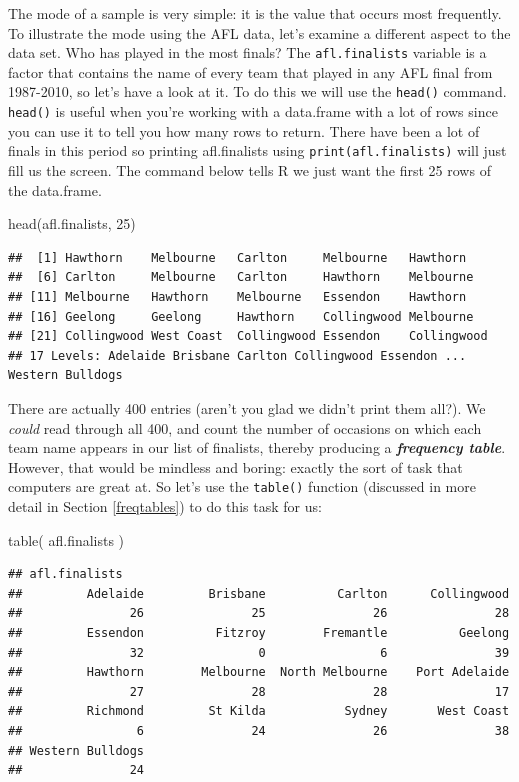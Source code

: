 \documentclass[
]{book}
\newenvironment{Shaded}{\begin{snugshade}}{\end{snugshade}}
\newcommand{\DecValTok}[1]{\textcolor[rgb]{0.00,0.00,0.81}{#1}}
\newcommand{\FunctionTok}[1]{\textcolor[rgb]{0.00,0.00,0.00}{#1}}
\newcommand{\NormalTok}[1]{#1}
\begin{document}
The mode of a sample is very simple: it is the value that occurs most frequently. To illustrate the mode using the AFL data, let's examine a different aspect to the data set. Who has played in the most finals? The \texttt{afl.finalists} variable is a factor that contains the name of every team that played in any AFL final from 1987-2010, so let's have a look at it. To do this we will use the \texttt{head()} command. \texttt{head()} is useful when you're working with a data.frame with a lot of rows since you can use it to tell you how many rows to return. There have been a lot of finals in this period so printing afl.finalists using \texttt{print(afl.finalists)} will just fill us the screen. The command below tells R we just want the first 25 rows of the data.frame.

\begin{Shaded}
\begin{Highlighting}[]
\FunctionTok{head}\NormalTok{(afl.finalists, }\DecValTok{25}\NormalTok{)}
\end{Highlighting}
\end{Shaded}

\begin{verbatim}
##  [1] Hawthorn    Melbourne   Carlton     Melbourne   Hawthorn   
##  [6] Carlton     Melbourne   Carlton     Hawthorn    Melbourne  
## [11] Melbourne   Hawthorn    Melbourne   Essendon    Hawthorn   
## [16] Geelong     Geelong     Hawthorn    Collingwood Melbourne  
## [21] Collingwood West Coast  Collingwood Essendon    Collingwood
## 17 Levels: Adelaide Brisbane Carlton Collingwood Essendon ... Western Bulldogs
\end{verbatim}

There are actually 400 entries (aren't you glad we didn't print them all?). We \emph{could} read through all 400, and count the number of occasions on which each team name appears in our list of finalists, thereby producing a \textbf{\emph{frequency table}}. However, that would be mindless and boring: exactly the sort of task that computers are great at. So let's use the \texttt{table()} function (discussed in more detail in Section \ref{freqtables}) to do this task for us:

\begin{Shaded}
\begin{Highlighting}[]
\FunctionTok{table}\NormalTok{( afl.finalists )}
\end{Highlighting}
\end{Shaded}

\begin{verbatim}
## afl.finalists
##         Adelaide         Brisbane          Carlton      Collingwood 
##               26               25               26               28 
##         Essendon          Fitzroy        Fremantle          Geelong 
##               32                0                6               39 
##         Hawthorn        Melbourne  North Melbourne    Port Adelaide 
##               27               28               28               17 
##         Richmond         St Kilda           Sydney       West Coast 
##                6               24               26               38 
## Western Bulldogs 
##               24
\end{verbatim}
\end{document}
